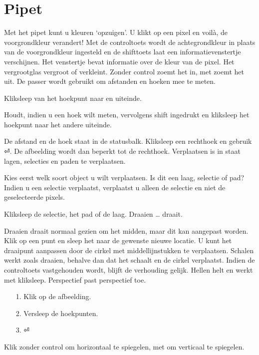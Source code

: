 \documentclass[11pt,a5paper,twoside]{book}
\begin{document}
  \section{Pipet}
   Met het pipet kunt u kleuren ‘opzuigen’. U klikt op een pixel en voilà,
    de voorgrondkleur verandert! Met de controltoets wordt de achtegrondkleur
    in plaats van de voorgrondkleur ingesteld en de shifttoets laat een
    informatievenstertje verschijnen. Het venstertje bevat informatie over de
    kleur van de pixel.
   Het vergrootglas vergroot of verkleint. Zonder control zoemt het in, met
    zoemt het uit.
   De passer wordt gebruikt om afstanden en hoeken mee te meten.

   Kliksleep van het hoekpunt naar en uiteinde.

   Houdt, indien u een hoek wilt meten, vervolgens shift ingedrukt en
    kliksleep het hoekpunt naar het andere uiteinde.

   De afstand en de hoek staat in de statusbalk.
   Kliksleep een rechthoek en gebruik ⏎. De afbeelding wordt dan beperkt
    tot de rechthoek.
    Verplaatsen is in staat lagen, selecties en paden te verplaatsen.

    Kies eerst welk soort object u wilt verplaatsen. Is dit een laag, selectie
     of pad? Indien u een selectie verplaatst, verplaatst u alleen de selectie
     en niet de geselecteerde pixels.

    Kliksleep de selectie, het pad of de laag.
    Draaien … draait.

    Draaien draait normaal gezien om het midden, maar dit kan aangepast worden.
    Klik op een punt en sleep het naar de gewenste nieuwe locatie. U kunt het
     draaipunt aanpassen door de cirkel met middellijnstukken te verplaatsen.
    Schalen werkt zoals draaien, behalve dan dat het schaalt en de cirkel
     verplaatst. Indien de controltoets vastgehouden wordt, blijft de verhouding
     gelijk.
    Hellen helt en werkt met kliksleep.
    Perspectief past perspectief toe.
    \begin{itemize}
     \item[1.] Klik op de afbeelding.
     \item[2.] Versleep de hoekpunten.
     \item[3.] ⏎
    \end{itemize}
    Klik zonder control om horizontaal te spiegelen, met om verticaal te
     spiegelen. 
\end{document}
